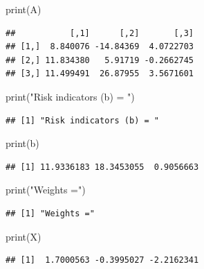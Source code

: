 \documentclass[
]{article}
\newenvironment{Shaded}{\begin{snugshade}}{\end{snugshade}}
\newcommand{\FunctionTok}[1]{\textcolor[rgb]{0.00,0.00,0.00}{#1}}
\newcommand{\NormalTok}[1]{#1}
\newcommand{\StringTok}[1]{\textcolor[rgb]{0.31,0.60,0.02}{#1}}
\begin{document}
\begin{Shaded}
\begin{Highlighting}[]
\FunctionTok{print}\NormalTok{(A)}
\end{Highlighting}
\end{Shaded}

\begin{verbatim}
##           [,1]      [,2]       [,3]
## [1,]  8.840076 -14.84369  4.0722703
## [2,] 11.834380   5.91719 -0.2662745
## [3,] 11.499491  26.87955  3.5671601
\end{verbatim}

\begin{Shaded}
\begin{Highlighting}[]
\FunctionTok{print}\NormalTok{(}\StringTok{"Risk indicators (b) = "}\NormalTok{)}
\end{Highlighting}
\end{Shaded}

\begin{verbatim}
## [1] "Risk indicators (b) = "
\end{verbatim}

\begin{Shaded}
\begin{Highlighting}[]
\FunctionTok{print}\NormalTok{(b)}
\end{Highlighting}
\end{Shaded}

\begin{verbatim}
## [1] 11.9336183 18.3453055  0.9056663
\end{verbatim}

\begin{Shaded}
\begin{Highlighting}[]
\FunctionTok{print}\NormalTok{(}\StringTok{"Weights ="}\NormalTok{)}
\end{Highlighting}
\end{Shaded}

\begin{verbatim}
## [1] "Weights ="
\end{verbatim}

\begin{Shaded}
\begin{Highlighting}[]
\FunctionTok{print}\NormalTok{(X)}
\end{Highlighting}
\end{Shaded}

\begin{verbatim}
## [1]  1.7000563 -0.3995027 -2.2162341
\end{verbatim}
\end{document}
